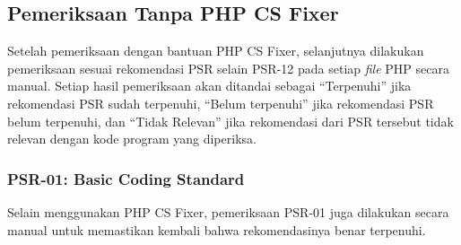 \subsection{Pemeriksaan Tanpa PHP CS Fixer}
\label{periksa_manual}
Setelah pemeriksaan dengan bantuan PHP CS Fixer, selanjutnya dilakukan pemeriksaan sesuai rekomendasi PSR selain PSR-12 pada setiap \textit{file} PHP secara manual. Setiap hasil pemeriksaan akan ditandai sebagai ``Terpenuhi'' jika rekomendasi PSR sudah terpenuhi, ``Belum terpenuhi'' jika rekomendasi PSR belum terpenuhi, dan ``Tidak Relevan'' jika rekomendasi dari PSR tersebut tidak relevan dengan kode program yang diperiksa.

\subsubsection{PSR-01: Basic Coding Standard}
Selain menggunakan PHP CS Fixer, pemeriksaan PSR-01 juga dilakukan secara manual untuk memastikan kembali bahwa rekomendasinya benar terpenuhi.
